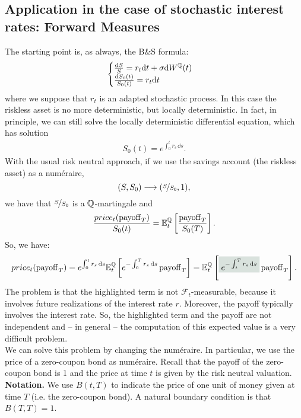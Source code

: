 \subsection[Forward Measures]{Application in the case of stochastic interest rates: Forward Measures} %
The starting point is, as always, the B\&S formula:
\begin{equation}
    \begin{cases}
    \frac{\dd S}{S} = r_t\dd t + \sigma\dd W^{\mathbb{Q}}(t) \\
    \frac{\dd S_0(t)}{S_0(t)} = r_t\dd t
    \end{cases}
\end{equation}
where we suppose that $r_t$ is an adapted stochastic process. In this case the riskless asset is no more deterministic, but locally deterministic. In fact, in principle, we can still solve the locally deterministic differential equation, which has solution
\begin{align*}
    S_0(t) = e^{\int_0^t r_s\,\dd s}.
\end{align*}
With the usual risk neutral approach, if we use the savings account (the riskless asset) as a numéraire,
\begin{equation}
    (S,S_0)\longrightarrow(\nicefrac{S}{S_0},1),
\end{equation}
we have that $\nicefrac{S}{S_0}$ is a $\mathbb{Q}$-martingale and
\begin{equation}
    \frac{price_t(\operatorname{payoff}_T)}{S_0(t)} = \mathbb{E}_t^{\mathbb{Q}} \left[\frac{\operatorname{payoff}_T}{S_0(T)}\right].
\end{equation}
So, we have:
\begin{equation}
    price_t(\pay_T) = e^{\int_0^t r_s\,\dd s}\mathbb{E}_t^{\Qmeas} \left[e^{-\int_0^T r_s\,\dd s}\pay_T\right] = \mathbb{E}_t^{\Qmeas} \left[\hlc{mytweed}{e^{-\int_t^T r_s\,\dd s}}\pay_T\right].
\end{equation}
The problem is that the highlighted term is not $\mathcal{F}_t$-measurable, because it involves future realizations of the interest rate $r$. Moreover, the payoff typically involves the interest rate. So, the highlighted term and the payoff are not independent and -- in general -- the computation of this expected value is a very difficult problem.\\
We can solve this problem by changing the numéraire. In particular, we use the price of a zero-coupon bond as numéraire. Recall that the payoff of the zero-coupon bond is 1 and the price at time $t$ is given by the risk neutral valuation.
\medbreak
\noindent\textbf{Notation.} We use $B(t,T)$ to indicate the price of one unit of money given at time $T$ (i.e. the zero-coupon bond). A natural boundary condition is that $B(T,T)=1$.
